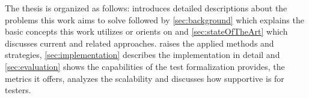 The thesis is organized as follows:  introduces detailed descriptions about the problems this work aims to solve followed by \cref{sec:background} which explains the basic concepts this work utilizes or orients on and \cref{sec:stateOfTheArt} which discusses current and related approaches.
 raises the applied methods and strategies, \cref{sec:implementation} describes the implementation in detail and \cref{sec:evaluation} shows the capabilities of the test formalization provides, the metrics it offers, analyzes the scalability and discusses how supportive \drivebuild{} is for testers.
